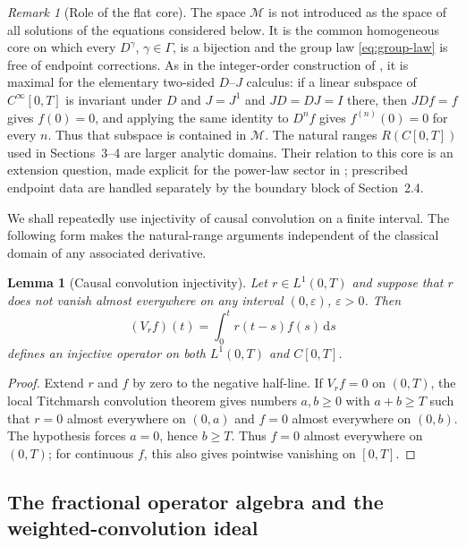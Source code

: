 \documentclass[11pt]{article}
\numberwithin{equation}{section}
\newtheorem{lemma}{Lemma}
\theoremstyle{definition}
\theoremstyle{remark}
\newtheorem{remark}{Remark}
\newcommand{\M}{\mathcal M}
\newcommand{\dd}{\,\mathrm d}
\begin{document}
\begin{remark}[Role of the flat core]\label{rem:flat-core}
The space $\M$ is not introduced as the space of all solutions of the equations
considered below.  It is the common homogeneous core on which every
$D^\gamma$, $\gamma\in\Gamma$, is a bijection and the group law
\eqref{eq:group-law} is free of endpoint corrections.  As in the integer-order
construction of \cite{Haghany2019}, it is maximal for the elementary
two-sided $D$--$J$ calculus: if a linear subspace of $C^\infty[0,T]$ is
invariant under $D$ and $J=J^1$ and $JD=DJ=I$ there, then $JDf=f$ gives
$f(0)=0$, and applying the same identity to $D^nf$ gives
$f^{(n)}(0)=0$ for every $n$.  Thus that subspace is contained in $\M$.
The natural ranges $R(C[0,T])$ used in Sections~3--4 are larger analytic
domains.  Their relation to this core is an extension question, made explicit
for the power-law sector in ; prescribed endpoint
data are handled separately by the boundary block of Section~2.4.
\end{remark}

We shall repeatedly use injectivity of causal convolution on a finite interval. The following form makes the natural-range arguments independent of the classical domain of any associated derivative.

\begin{lemma}[Causal convolution injectivity]\label{lem:injectivity}
Let $r\in L^1(0,T)$ and suppose that $r$ does not vanish almost everywhere on any interval $(0,\varepsilon)$, $\varepsilon>0$. Then
\begin{equation}
(V_rf)(t)=\int_0^t r(t-s)f(s)\dd s
\label{eq:Vr}
\end{equation}
defines an injective operator on both $L^1(0,T)$ and $C[0,T]$.
\end{lemma}

\begin{proof}
Extend $r$ and $f$ by zero to the negative half-line. If $V_rf=0$ on $(0,T)$, the local Titchmarsh convolution theorem \cite{Titchmarsh1948} gives numbers $a,b\ge0$ with $a+b\ge T$ such that $r=0$ almost everywhere on $(0,a)$ and $f=0$ almost everywhere on $(0,b)$. The hypothesis forces $a=0$, hence $b\ge T$. Thus $f=0$ almost everywhere on $(0,T)$; for continuous $f$, this also gives pointwise vanishing on $[0,T]$.
\end{proof}

\subsection{The fractional operator algebra and the weighted-convolution ideal}
\end{document}
